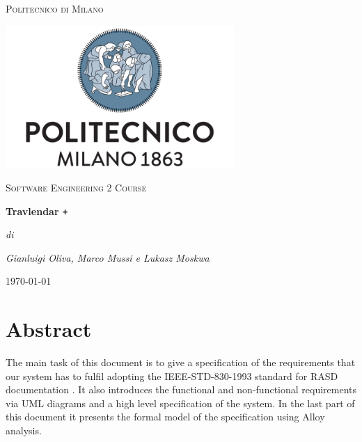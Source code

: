 \documentclass[numbers=noenddot, 12pt, a4paper, oneside]{scrbook}
\def\Plus{\texttt{+}}
\begin{document}
	
 
\begin{titlepage}
	\centering
	{\scshape\LARGE Politecnico di Milano \par}
	\vspace{1cm}
	\includegraphics[width=0.65\textwidth]{polimi-logo}\par
	\vspace{1cm}
		
	{\scshape\Large Software Engineering 2 Course\par}
	\vspace{1.5cm}
	{\huge\bfseries Travlendar \Plus \par}
	\vspace{6cm}
	{\Large\itshape di\par}
	{\Large\itshape Gianluigi Oliva, Marco Mussi e Lukasz Moskwa\par}
	\vfill

	
	\vfill
	
	{\large \today\par}
\end{titlepage}

\newpage 
\tableofcontents
\newpage 

\section*{Abstract}

The main task of this document is to give a specification of the requirements that our system has to fulfil adopting the IEEE-STD-830-1993 standard for RASD documentation . It also introduces the functional and non-functional requirements via UML diagrams and a high level specification of the system. In the last part of this document it presents the formal model of the specification using Alloy analysis. \\
\end{document}
